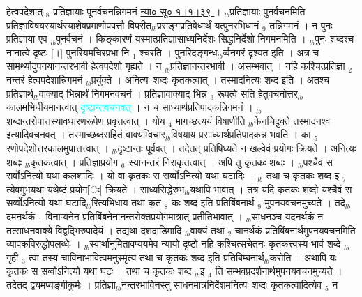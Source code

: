 \documentclass[article,12pt,a4paper]{memoir}%
\newcommand{\quotelemma}[1]{\textcolor{cyan}{#1}}
\begin{document}
	  
	  \pstart \leavevmode%
	\hphantom{.}हेत्वपदेशात् {\tiny $_{8}$} प्रतिज्ञायाः पूनर्वचनन्निगमनं \href{http://sarit.indology.info/?cref=ns\%C5\%AB.1.1.39}{न्या० सू० १।१।३९ } । {\tiny $_{lb}$}प्रतिज्ञायाः पुनर्वचनमिति प्रतिज्ञाविषयस्यार्थस्याशेषप्रमाणोपपत्तौ विपरीत{\tiny $_{lb}$}प्रसङ्गप्रतिषेधार्थं यत्पुनरभिधानं {\tiny $_{9}$} \leavevmode{} तन्निगमनं । न पुनः प्रतिज्ञाया एव {\tiny $_{lb}$}पुनर्वचनं । किङ्कारणं यस्मात्प्रतिज्ञासाध्यनिर्देशः सिद्धनिर्देशो निगमनमिति । {\tiny $_{lb}$}पुनः शब्दश्च नानात्वे दृष्टः [।] पुनरियमचिरप्रभा नि {\tiny $_{1}$} श्चरति । पुनरिदङ्गन्ध{\tiny $_{lb}$}र्व्वनगरं दृश्यत इति । अत्र च सामर्थ्यादुपनयानन्तरभावी हेत्वपदेशो गृह्यते । न {\tiny $_{lb}$}प्रतिज्ञानन्तरभावी । असम्भवात् । नहि कश्चित्प्रतिज्ञा {\tiny $_{2}$} नन्तरं हेत्वपदेशान्निगमनं {\tiny $_{lb}$}प्रयुंक्ते । अनित्यः शब्दः कृतकत्वात् । तस्मादनित्यः शब्द इति । अतश्च प्रतिज्ञार्थ{\tiny $_{lb}$}वाक्याद् भिन्नार्थं निगमनवचनं । प्रतिज्ञावाक्याद् भिन्न {\tiny $_{3}$} रूपत्वे सति हेतुवचनोत्तर{\tiny $_{lb}$}कालमभिधीयमानत्वात् \quotelemma{दृष्टान्तवचनवत्} । न च साध्यार्थप्रतिपादकन्निगमनं । {\tiny $_{lb}$}शब्दान्तरोपात्तस्यावधारणरूपेण प्रवृत्तत्वात् । योय {\tiny $_{4}$} मागच्छत्ययं विषाणीति {\tiny $_{lb}$}केनचिदुक्ते तस्मादनश्व इत्यादिवचनवत् । तस्माच्छब्दसहितं वाक्यम्विचार{\tiny $_{lb}$}विषयाय प्रसाध्यार्थप्रतिपादकन्न भवति । का {\tiny $_{5}$} रणोपदेशोत्तरकालमुपात्तत्त्वात् । {\tiny $_{lb}$}दृष्टान्तः पूर्ववत् । तदेतत् प्रतिषिध्यते न खल्वेवं प्रयोगः क्रियते । अनित्यः शब्दः {\tiny $_{lb}$}कृतकत्वात् । प्रतिज्ञाप्रयोग {\tiny $_{6}$} स्यानन्तरं निराकृतत्वात् । अपि तु कृतकः शब्दः । {\tiny $_{lb}$}पश्चैवं स सर्वोऽनित्यो यथा कलशादिः । यो वा कृतकः स सर्व्वोऽनित्यो यथा घटादिः । {\tiny $_{lb}$} \leavevmode{} तथा च कृतकः शब्द इ {\tiny $_{7}$} त्येवमुभयथा यथेष्टं प्रयोग[ः] क्रियते । साध्यसिद्धेरुभ{\tiny $_{lb}$}यथापि भावात् । तत्र यदि कृतकः शब्दो यश्चैवं स सर्व्वोऽनित्यो यथा घटादि{\tiny $_{lb}$}रित्यभिधाय तथा कृत {\tiny $_{8}$} कः शब्द इति प्रतिबिंबनार्थ {\tiny $_{9}$} \leavevmode{} मुपनयवचनमुच्यते । तदे{\tiny $_{lb}$}दमनर्थकं {\tiny $_{1}$} विनाप्यनेन प्रतिबिंबनेनानन्तरोक्तप्रयोगमात्रात् प्रतीतिभावात् । {\tiny $_{lb}$}साधनञ्च यदनर्थकं न तत्साधनवाक्ये विद्वद्भिरुपादेयं । तद्यथा दशदाडिमादि {\tiny $_{lb}$}वाक्यं तथा {\tiny $_{2}$} चानर्थकं प्रतिबिंबनार्थमुपनयवचनमिति व्यापकविरुद्धोपलब्धेः । {\tiny $_{lb}$}स्वार्थानुमितावप्ययमेव न्यायो दृष्टो नहि कश्चित्सचेतनः कृतकत्त्वस्य भावं शब्दे {\tiny $_{lb}$}गृही {\tiny $_{3}$} त्वा तस्य चाविनाभावित्वमनुस्मृत्य तथा च कृतकः शब्द इति प्रतिबिम्बनार्थ{\tiny $_{lb}$}करोति । अथापि यः कृतकः स सर्व्वोऽनित्यो यथा घटः । तथा च कृतकः शब्द {\tiny $_{lb}$}इ {\tiny $_{4}$} ति सम्भवप्रदर्शनार्थमुपनयवचनमुच्यते । तदेतद् द्वयमप्यङ्गीकुर्मः । प्रतिज्ञा{\tiny $_{lb}$}नन्तरभाविनस्तु साधनमात्रनिर्देशमनित्यः शब्दः कृतकत्वादित्येव {\tiny $_{5}$} न 
\end{document}
